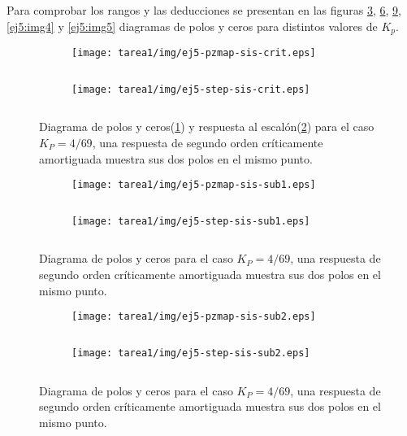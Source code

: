 \begin{ejercicio}
  Para comprobar los rangos y las deducciones se presentan en las figuras \ref{ej5:img1}, \ref{ej5:img2}, \ref{ej5:img3}, \ref{ej5:img4} y \ref{ej5:img5} diagramas de polos y ceros para distintos valores de $K_p$.

    \begin{figure}[H]
      \centering
      \begin{subfigure}{0.48\textwidth}
        \centering
        \texttt{[image: tarea1/img/ej5-pzmap-sis-crit.eps]}
        \caption{$\quad$}
        \label{ej5:img1:a}
      \end{subfigure}
      \begin{subfigure}{0.48\textwidth}
        \centering
        \texttt{[image: tarea1/img/ej5-step-sis-crit.eps]}
        \caption{$\quad$}
        \label{ej5:img1:b}
      \end{subfigure}
      \caption{Diagrama de polos y ceros(\ref{ej5:img1:a}) y respuesta al escalón(\ref{ej5:img1:b}) para el caso $K_P = 4/69$, una respuesta de segundo orden críticamente amortiguada muestra sus dos polos en el mismo punto.}
      \label{ej5:img1}
    \end{figure}
    
    \begin{figure}[H]
      \centering
      \begin{subfigure}{0.48\textwidth}
        \centering
        \texttt{[image: tarea1/img/ej5-pzmap-sis-sub1.eps]}
        \caption{$\quad$}
        \label{ej5:img2:a}
      \end{subfigure}
      \begin{subfigure}{0.48\textwidth}
        \centering
        \texttt{[image: tarea1/img/ej5-step-sis-sub1.eps]}
        \caption{$\quad$}
        \label{ej5:img2:b}
      \end{subfigure}
      \caption{Diagrama de polos y ceros para el caso $K_P = 4/69$, una respuesta de segundo orden críticamente amortiguada muestra sus dos polos en el mismo punto.}
      \label{ej5:img2}
    \end{figure}

    \begin{figure}[H]
      \centering
      \begin{subfigure}{0.48\textwidth}
        \centering
        \texttt{[image: tarea1/img/ej5-pzmap-sis-sub2.eps]}
        \caption{$\quad$}
        \label{ej5:img3:a}
      \end{subfigure}
      \begin{subfigure}{0.48\textwidth}
        \centering
        \texttt{[image: tarea1/img/ej5-step-sis-sub2.eps]}
        \caption{$\quad$}
        \label{ej5:img3:b}
      \end{subfigure}
      \caption{Diagrama de polos y ceros para el caso $K_P = 4/69$, una respuesta de segundo orden críticamente amortiguada muestra sus dos polos en el mismo punto.}
      \label{ej5:img3}
    \end{figure}


\end{ejercicio}
